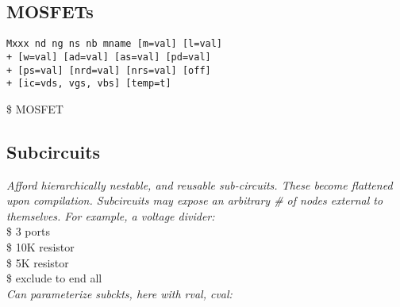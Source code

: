 \subsection*{MOSFETs}
\begin{lstlisting}
Mxxx nd ng ns nb mname [m=val] [l=val] 
+ [w=val] [ad=val] [as=val] [pd=val]
+ [ps=val] [nrd=val] [nrs=val] [off] 
+ [ic=vds, vgs, vbs] [temp=t]
\end{lstlisting}
 \$ MOSFET \\




\subsection*{Subcircuits}
\textit{Afford hierarchically nestable, and reusable sub-circuits. These become flattened upon compilation.  Subcircuits may expose an arbitrary \# of nodes external to themselves. For example, a voltage divider:}\\
 \$ 3 ports \\
 \$ 10K resistor \\
 \$ 5K resistor \\
 \$ exclude to end all \\[2mm]
\textit{Can parameterize subckts, here with rval, cval:}\\
 \\